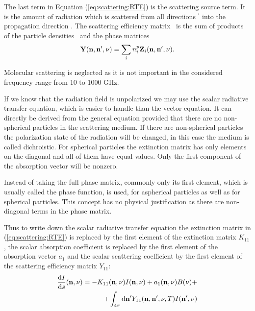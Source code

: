 The last term in Equation (\ref{eq:scattering:RTE}) is the scattering
source term. It is the amount of radiation which is scattered from all
directions \PDir$^\prime$ into the propagation direction \PDir.  The
scattering efficiency matrix \SEfMat\ is the sum of products of the
particle densities \PDen\ and the phase matrices \PhaMat
\begin{eqnarray}
{\bf Y}({\bf n}, {\bf n}', \nu) = \sum_i{n^p_i{\bf Z}_i({\bf n},
  {\bf n}', \nu)}.
\end{eqnarray}

Molecular scattering is neglected as it is not important in the
considered frequency range from 10 to 1000 GHz.


\label{sec:scattering:scalar_rte}

If we know that the radiation field is unpolarized we may use the
scalar radiative transfer equation, which is easier to handle than the
vector equation. It can directly be derived from the general equation
provided that there are no non-spherical particles in the scattering
medium. If there are non-spherical particles the polarization state of
the radiation will be changed, in this case the medium is called
dichroistic.  For spherical particles the extinction matrix has only
elements on the diagonal and all of them have equal values. Only the
first component of the absorption vector will be nonzero.

Instead of taking the full phase matrix, commonly only its first
element, which is usually called the phase function, is used, for
aspherical particles as well as for spherical particles. This concept has no physical justification as
there are non-diagonal terms in the phase matrix.

Thus to write down the scalar radiative transfer equation the
extinction matrix in (\ref{eq:scattering:RTE}) is replaced by the
first element of the extinction matrix $K_{11}$, the scalar absorption
coefficient is replaced by the first element of the absorption vector
$a_1$ and the scalar scattering coefficient by the first element of
the scattering efficiency matrix $Y_{11}$:
\begin{eqnarray}
  \label{eq:scattering:scalar_rte}
\frac{\mathrm{d} I}{\mathrm{d} s} ({\bf n}, \nu) = -K_{11}({\bf n}, \nu)I
({\bf n}, \nu) + a_1({\bf n}, \nu)B(\nu) + \\ \nonumber
 +\int_{4\pi} \mathrm{d} {\bf n}^\prime Y_{11}({\bf n}, {\bf n}^\prime, \nu, T) I({\bf n}^\prime,
  \nu)
\end{eqnarray}

